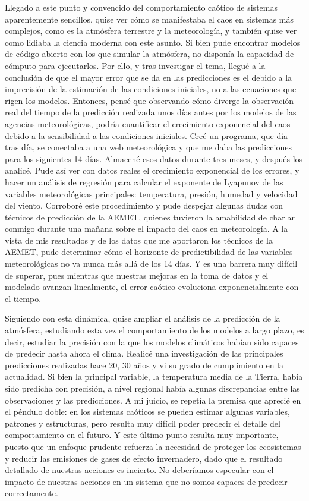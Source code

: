 \documentclass[
  10pt,
  a4paper,
  DIV=11,
  numbers=noendperiod,
  open=any]{scrreprt}
\numberwithin{equation}{chapter}
\numberwithin{equation}{section}
\renewcommand{\[}{\begin{equation}}
\renewcommand{\]}{\end{equation}}
\begin{document}
Llegado a este punto y convencido del comportamiento caótico de sistemas
aparentemente sencillos, quise ver cómo se manifestaba el caos en
sistemas más complejos, como es la atmósfera terrestre y la
meteorología, y también quise ver como lidiaba la ciencia moderna con
este asunto. Si bien pude encontrar modelos de código abierto con los
que simular la atmósfera, no disponía la capacidad de cómputo para
ejecutarlos. Por ello, y tras investigar el tema, llegué a la conclusión
de que el mayor error que se da en las predicciones es el debido a la
imprecisión de la estimación de las condiciones iniciales, no a las
ecuaciones que rigen los modelos. Entonces, pensé que observando cómo
diverge la observación real del tiempo de la predicción realizada unos
días antes por los modelos de las agencias meteorológicas, podría
cuantificar el crecimiento exponencial del caos debido a la sensibilidad
a las condiciones iniciales. Creé un programa, que día tras día, se
conectaba a una web meteorológica y que me daba las predicciones para
los siguientes 14 días. Almacené esos datos durante tres meses, y
después los analicé. Pude así ver con datos reales el crecimiento
exponencial de los errores, y hacer un análisis de regresión para
calcular el exponente de Lyapunov de las variables meteorológicas
principales: temperatura, presión, humedad y velocidad del viento.
Corroboré este procedimiento y pude despejar algunas dudas con técnicos
de predicción de la AEMET, quienes tuvieron la amabilidad de charlar
conmigo durante una mañana sobre el impacto del caos en meteorología. A
la vista de mis resultados y de los datos que me aportaron los técnicos
de la AEMET, pude determinar cómo el horizonte de predictibilidad de las
variables meteorológicas no va nunca más allá de los 14 días. Y es una
barrera muy difícil de superar, pues mientras que nuestras mejoras en la
toma de datos y el modelado avanzan linealmente, el error caótico
evoluciona exponencialmente con el tiempo.

Siguiendo con esta dinámica, quise ampliar el análisis de la predicción
de la atmósfera, estudiando esta vez el comportamiento de los modelos a
largo plazo, es decir, estudiar la precisión con la que los modelos
climáticos habían sido capaces de predecir hasta ahora el clima. Realicé
una investigación de las principales predicciones realizadas hace 20, 30
años y vi su grado de cumplimiento en la actualidad. Si bien la
principal variable, la temperatura media de la Tierra, había sido
predicha con precisión, a nivel regional había algunas discrepancias
entre las observaciones y las predicciones. A mi juicio, se repetía la
premisa que aprecié en el péndulo doble: en los sistemas caóticos se
pueden estimar algunas variables, patrones y estructuras, pero resulta
muy difícil poder predecir el detalle del comportamiento en el futuro. Y
este último punto resulta muy importante, puesto que un enfoque prudente
refuerza la necesidad de proteger los ecosistemas y reducir las
emisiones de gases de efecto invernadero, dado que el resultado
detallado de nuestras acciones es incierto. No deberíamos especular con
el impacto de nuestras acciones en un sistema que no somos capaces de
predecir correctamente.
\end{document}
